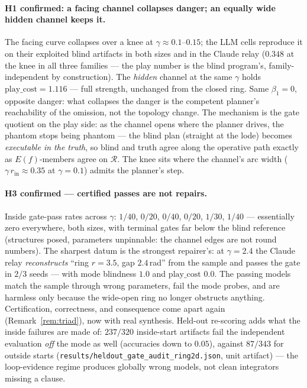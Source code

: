 \documentclass[11pt]{article}
\theoremstyle{remark}
\begin{document}
\paragraph{H1 confirmed: a facing channel collapses danger; an equally
wide hidden channel keeps it.} The facing
curve collapses
over a knee at $\gamma \approx 0.1$--$0.15$; the LLM cells reproduce it on
their exploited blind artifacts in both sizes and in the Claude relay
($0.348$ at the knee in all three families --- the play number is the blind
program's, family-independent by construction). The \emph{hidden} channel
at the same $\gamma$ holds $\mathrm{play\_cost} = 1.116$ --- full
strength, unchanged from the closed ring. Same $\beta_1 = 0$, opposite
danger: what collapses the danger is the competent planner's reachability
of the omission, not the topology change. The mechanism is the gate
quotient on the play side: as the channel opens where the planner drives,
the phantom stops being phantom --- the blind plan (straight at the lode)
becomes \emph{executable in the truth}, so blind and truth agree along the
operative path exactly as $E(f)$-members agree on $\mathcal{R}$. The knee
sits where the channel's arc width
($\gamma\, r_{\mathrm{in}} \approx 0.35$ at $\gamma = 0.1$) admits the
planner's step.

\paragraph{H3 confirmed --- certified passes are not repairs.} Inside
gate-pass rates across $\gamma$: $1/40$, $0/20$, $0/40$, $0/20$, $1/30$,
$1/40$ --- essentially zero everywhere, both sizes, with terminal gates far
below the blind reference (structures posed, parameters unpinnable: the
channel edges are not round numbers). The sharpest datum is the strongest
repairer's: at $\gamma = 2.4$ the Claude relay \emph{reconstructs} ``ring
$r = 3.5$, gap $2.4$\,rad'' from the sample and passes the gate in $2/3$
seeds --- with mode blindness $1.0$ and $\mathrm{play\_cost}$ $0.0$. The
passing models match the sample through wrong parameters, fail the mode
probes, and are harmless only because the wide-open ring no longer
obstructs anything. Certification, correctness, and consequence come apart
again (Remark~\ref{rem:triad}), now with real synthesis. Held-out
re-scoring adds what the inside failures are made of: $237/320$
inside-start artifacts fail the independent evaluation \emph{off} the
mode as well (accuracies down to $0.05$), against $87/343$ for outside
starts (\texttt{results/heldout\_gate\_audit\_ring2d.json}, unit
artifact) --- the loop-evidence regime produces globally wrong models,
not clean integrators missing a clause.
\end{document}
